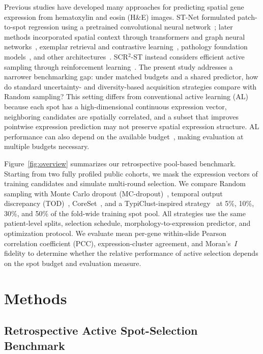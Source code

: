 \documentclass[]{spie}
\begin{document}
Previous studies have developed many approaches for predicting spatial gene expression from hematoxylin and eosin (H\&E) images. ST-Net formulated patch-to-spot regression using a pretrained convolutional neural network~\cite{he2020integrating}; later methods incorporated spatial context through transformers and graph neural networks~\cite{pang2021leveraging,zeng2022spatial}, exemplar retrieval and contrastive learning~\cite{yang2023exemplar,xie2023bleep}, pathology foundation models~\cite{chen2024uni}, and other architectures~\cite{zhu2025magnet,zhu2025img2st,zhu2026duet}. SCR$^2$-ST instead considers efficient active sampling through reinforcement learning~\cite{zhu2025scr2}. The present study addresses a narrower benchmarking gap: under matched budgets and a shared predictor, how do standard uncertainty- and diversity-based acquisition strategies compare with Random sampling? This setting differs from conventional active learning (AL) because each spot has a high-dimensional continuous expression vector, neighboring candidates are spatially correlated, and a subset that improves pointwise expression prediction may not preserve spatial expression structure. AL performance can also depend on the available budget~\cite{hacohen2022active}, making evaluation at multiple budgets necessary.

Figure~\ref{fig:overview} summarizes our retrospective pool-based benchmark. Starting from two fully profiled public cohorts, we mask the expression vectors of training candidates and simulate multi-round selection. We compare Random sampling with Monte Carlo dropout (MC-dropout)~\cite{gal2016dropout,gal2017deep}, temporal output discrepancy (TOD)~\cite{huang2021semi}, CoreSet~\cite{sener2018active}, and a TypiClust-inspired strategy~\cite{hacohen2022active} at 5\%, 10\%, 30\%, and 50\% of the fold-wide training spot pool. All strategies use the same patient-level splits, selection schedule, morphology-to-expression predictor, and optimization protocol. We evaluate mean per-gene within-slide Pearson correlation coefficient (PCC), expression-cluster agreement, and Moran's~$I$ fidelity to determine whether the relative performance of active selection depends on the spot budget and evaluation measure.

\section{Methods}
\label{sec:method}

\subsection{Retrospective Active Spot-Selection Benchmark}
\label{sec:benchmark}
\end{document}
